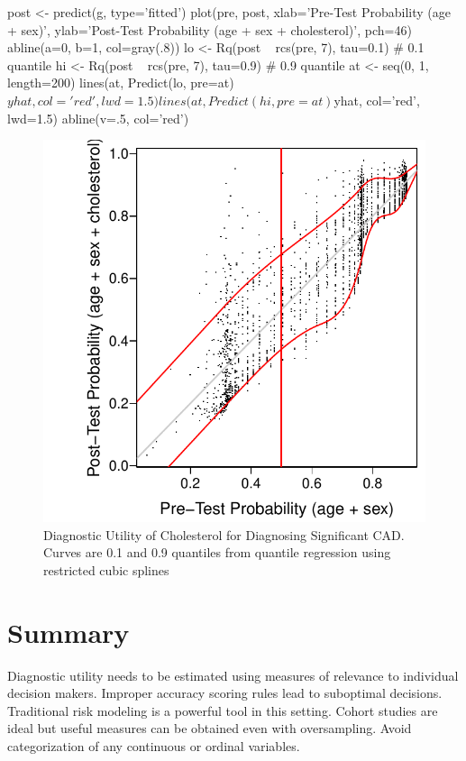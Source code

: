 \begin{Schunk}
\begin{Sinput}
post <- predict(g, type='fitted')
plot(pre, post, xlab='Pre-Test Probability (age + sex)',
     ylab='Post-Test Probability (age + sex + cholesterol)', pch=46)
abline(a=0, b=1, col=gray(.8))
lo <- Rq(post ~ rcs(pre, 7), tau=0.1)  # 0.1 quantile
hi <- Rq(post ~ rcs(pre, 7), tau=0.9)  # 0.9 quantile
at <- seq(0, 1, length=200)
lines(at, Predict(lo, pre=at)$yhat, col='red', lwd=1.5)
lines(at, Predict(hi, pre=at)$yhat, col='red', lwd=1.5)
abline(v=.5, col='red')
\end{Sinput}
\begin{figure}[htbp]

\centerline{\includegraphics[width=\maxwidth]{dx-du-acath-1} }

\caption[Diagnostic Utility of Cholesterol for Diagnosing Significant CAD]{Diagnostic Utility of Cholesterol for Diagnosing Significant CAD.  Curves are 0.1 and 0.9 quantiles from quantile regression using restricted cubic splines}\label{fig:dx-du-acath}
\end{figure}
\end{Schunk}

\section{Summary}
{\smaller Diagnostic utility needs to be estimated using measures of
relevance to individual decision makers.  Improper accuracy scoring rules lead to suboptimal decisions.  Traditional risk modeling is a powerful tool in this setting.  Cohort studies are ideal but useful measures can be obtained
even with oversampling.  Avoid categorization of any continuous or ordinal variables.}
